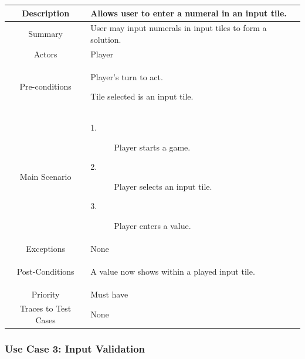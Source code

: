 \documentclass[12pt]{article}
\begin{document}
\begin{table}[htbp]
\begin{center}
\begin{tabular}{| c | m{10cm} |}
\hline
\cellcolor{lightgray}Description & Allows user to enter a numeral in an input tile. \\
\hline
\cellcolor{lightgray}Summary & User may input numerals in input tiles to form a solution. \\
\hline
\cellcolor{lightgray}Actors & Player \\
\hline
\cellcolor{lightgray}Pre-conditions &
\begin{description}[font=$\bullet$~\normalfont\scshape]
\item Player's turn to act.
\item Tile selected is an input tile. 
\end{description}\\
\hline
\cellcolor{lightgray}Main Scenario & 
\begin{description}
\item [1.]Player starts a game.
\item [2.]Player selects an input tile. 
\item [3.]Player enters a value.
\end{description}\\
\hline
\cellcolor{lightgray}Exceptions & None \\
\hline
\cellcolor{lightgray}Post-Conditions & 
\begin{description}[font=$\bullet$~\normalfont\scshape]
\item A value now shows within a played input tile.
\end{description}\\
\hline
\cellcolor{lightgray}Priority & Must have \\
\hline
\cellcolor{lightgray}Traces to Test Cases & None \\
\hline
\end{tabular}
\end{center}
\end{table}

\clearpage
\subsubsection{Use Case 3: Input Validation} \label{uc:1}
\end{document}
